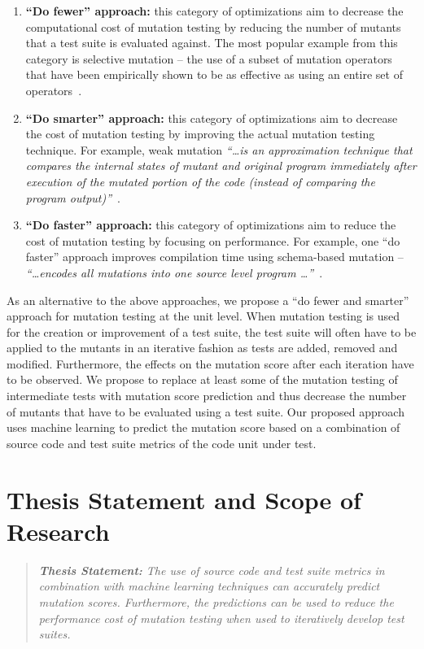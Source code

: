 \begin{enumerate}
  \item \textbf{``Do fewer'' approach:} this category of optimizations aim to decrease the computational cost of mutation testing by reducing the number of mutants that a test suite is evaluated against. The most popular example from this category is selective mutation -- the use of a subset of mutation operators that have been empirically shown to be as effective as using an entire set of operators~\cite{OLR+96}.

  \item \textbf{``Do smarter'' approach:} this category of optimizations aim to decrease the cost of mutation testing by improving the actual mutation testing technique. For example, weak mutation \emph{``\ldots is an approximation technique that compares the internal states of mutant and original program immediately after execution of the mutated portion of the code (instead of comparing the program output)''}~\cite{OU00}.

  \item \textbf{``Do faster'' approach:} this category of optimizations aim to reduce the cost of mutation testing by focusing on performance. For example, one ``do faster'' approach improves compilation time using schema-based mutation -- \emph{``\ldots encodes all mutations into one source level program \ldots''}~\cite{OU00}.
\end{enumerate}

As an alternative to the above approaches, we propose a ``do fewer and smarter'' approach for mutation testing at the unit level. When mutation testing is used for the creation or improvement of a test suite, the test suite will often have to be applied to the mutants in an iterative fashion as tests are added, removed and modified. Furthermore, the effects on the mutation score after each iteration have to be observed. We propose to replace at least some of the mutation testing of intermediate tests with mutation score prediction and thus decrease the number of mutants that have to be evaluated using a test suite. Our proposed approach uses machine learning to predict the mutation score based on a combination of source code and test suite metrics of the code unit under test.


\section{Thesis Statement and Scope of Research}
\label{sec:introduction_statement_and_scope}
\begin{quote}
  \emph{\textbf{Thesis Statement:} The use of source code and test suite metrics in combination with machine learning techniques can accurately predict mutation scores. Furthermore, the predictions can be used to reduce the performance cost of mutation testing when used to iteratively develop test suites.}
\end{quote}

